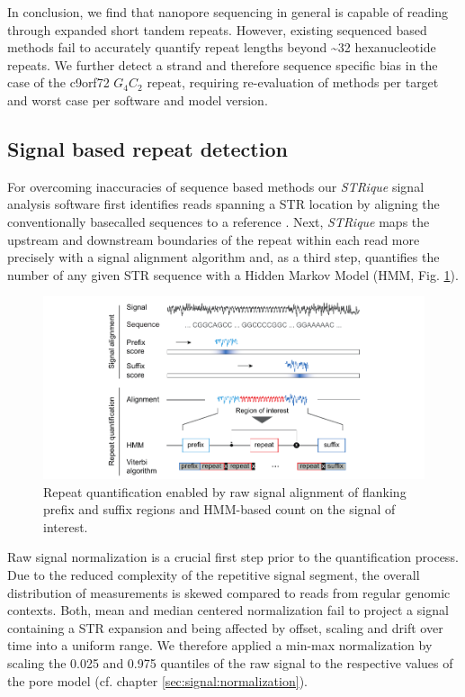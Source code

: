 In conclusion, we find that nanopore sequencing in general is capable of reading through expanded short tandem repeats. However, existing sequenced based methods fail to accurately quantify repeat lengths beyond \textasciitilde32 hexanucleotide repeats. We further detect a strand and therefore sequence specific bias in the case of the c9orf72 $ G_{4}C_{2} $ repeat, requiring re-evaluation of methods per target and worst case per software and model version.




\subsection{Signal based repeat detection}
\label{subsec:strique:sig_repeat_counts}

For overcoming inaccuracies of sequence based methods our \textit{STRique} signal analysis software first identifies reads spanning a STR location by aligning the conventionally basecalled sequences to a reference \cite{Li2018}. Next, \textit{STRique} maps the upstream and downstream boundaries of the repeat within each read more precisely with a signal alignment algorithm and, as a third step, quantifies the number of any given STR sequence with a Hidden Markov Model (HMM, Fig. \ref{fig:strique:count_structure_plasmid}). 

\begin{figure}[h]
	\centering
	\includegraphics[width=1.0\textwidth]{figures/strique/count_structure_plasmid.pdf}
	\captionsetup{format=plain}
	\caption[\textit{STRique}: generic repeat detection pipeline on raw nanopore signals]{Repeat quantification enabled by raw signal alignment of flanking prefix and suffix regions and HMM-based count on the signal of interest.}
	\label{fig:strique:count_structure_plasmid}
\end{figure}

Raw signal normalization is a crucial first step prior to the quantification process. Due to the reduced complexity of the repetitive signal segment, the overall distribution of measurements is skewed compared to reads from regular genomic contexts. Both, mean and median centered normalization fail to project a signal containing a STR expansion and being affected by offset, scaling and drift over time into a uniform range. 
We therefore applied a min-max normalization by scaling the 0.025 and 0.975 quantiles of the raw signal to the respective values of the pore model (cf. chapter \ref{sec:signal:normalization}).

